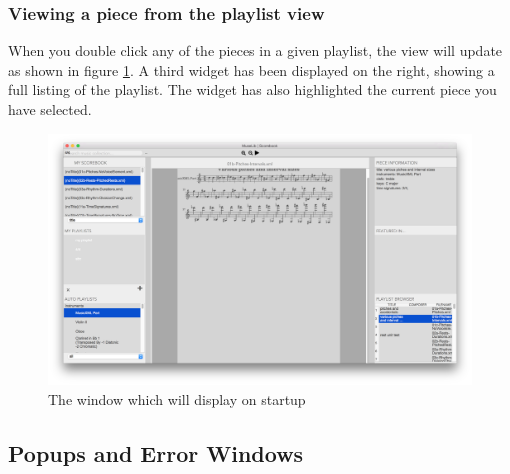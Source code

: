 \subsubsection{Viewing a piece from the playlist view}
When you double click any of the pieces in a given playlist, the view will update as shown in figure \ref{fig:playlistbrowser}. A third widget has been displayed on the right, showing a full listing of the playlist. The widget has also highlighted the current piece you have selected.
\begin{figure}[H]
\centering
\includegraphics[width=500pt]{playlistbrowser}
\caption{The window which will display on startup}
\label{fig:playlistbrowser}	
\end{figure}

\subsection{Popups and Error Windows}
